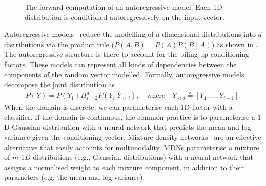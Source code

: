 \begin{figure}
\caption{The forward computation of an autoregressive model. Each 1D distribution is conditioned autoregressively on the input vector.} \label{fig:AM}
\end{figure}
Autoregressive models~\citep{graves2013generating, germain2015made, van2016conditional, wong2000mixture} reduce the modelling of $d$-dimensional distributions into $d$ distributions via the product rule ($P(A, B) = P(A) P(B\mid A)$) as shown in . The autoregressive structure is there to account for the piling-up conditioning factors. These models can represent all kinds of dependencies between the components of the random vector modelled.
Formally, autoregressive models decompose the joint distribution as
\begin{align}
  P(Y) = P(Y_1) \Pi^d_{i=2} P(Y_i|Y_{<i}), \quad \text{where} \quad Y_{<i} \triangleq \left[ Y_1, \dots, Y_{i-1}\right].
\end{align}
When the domain is discrete, we can parameterise each $1$D factor with a classifier. If the domain is continuous, the common practice is to parameterise a $1$D Gaussian distribution with a neural network that predicts the mean and log-variance given the conditioning vector. Mixture density networks~\citep[][MDNs]{bishop1994mixture} are an effective alternative that easily accounts for multimodality. MDNs parameterise a mixture of $m$ $1D$ distributions (e.g., Gaussian distributions) with a neural network that assigns a normalised weight to each mixture component, in addition to their parameters (e.g. the mean and log-variance).
